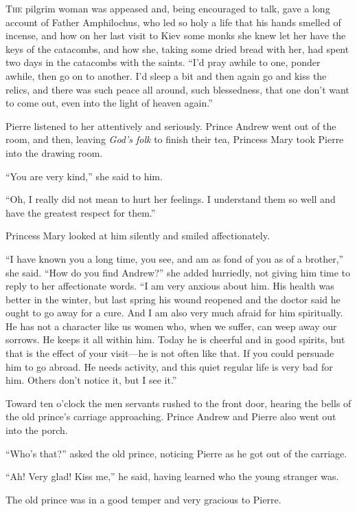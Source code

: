 \lettrine[lines=2, loversize=0.3, lraise=0]{\initfamily T}{he}
pilgrim woman was appeased and, being encouraged to talk,
gave a long account of Father Amphilochus, who led so holy a life
that his hands smelled of incense, and how on her last visit to
Kiev some monks she knew let her have the keys of the catacombs,
and how she, taking some dried bread with her, had spent two days
in the catacombs with the saints. ``I'd pray awhile to one,
ponder awhile, then go on to another.  I'd sleep a bit and then
again go and kiss the relics, and there was such peace all
around, such blessedness, that one don't want to come out, even
into the light of heaven again.''

Pierre listened to her attentively and seriously. Prince Andrew
went out of the room, and then, leaving \emph{God's folk} to finish
their tea, Princess Mary took Pierre into the drawing room.

``You are very kind,'' she said to him.

``Oh, I really did not mean to hurt her feelings. I understand
them so well and have the greatest respect for them.''

Princess Mary looked at him silently and smiled affectionately.

``I have known you a long time, you see, and am as fond of you as
of a brother,'' she said. ``How do you find Andrew?'' she added
hurriedly, not giving him time to reply to her affectionate
words. ``I am very anxious about him. His health was better in
the winter, but last spring his wound reopened and the doctor
said he ought to go away for a cure. And I am also very much
afraid for him spiritually. He has not a character like us women
who, when we suffer, can weep away our sorrows. He keeps it all
within him. Today he is cheerful and in good spirits, but that is
the effect of your visit---he is not often like that. If you
could persuade him to go abroad. He needs activity, and this
quiet regular life is very bad for him. Others don't notice it,
but I see it.''

Toward ten o'clock the men servants rushed to the front door,
hearing the bells of the old prince's carriage
approaching. Prince Andrew and Pierre also went out into the
porch.

``Who's that?'' asked the old prince, noticing Pierre as he got
out of the carriage.

``Ah! Very glad! Kiss me,'' he said, having learned who the young
stranger was.

The old prince was in a good temper and very gracious to Pierre.

